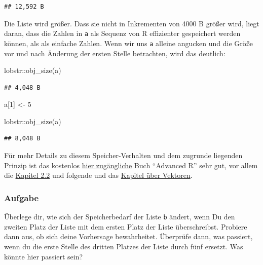 \documentclass[
]{book}
\newenvironment{Shaded}{\begin{snugshade}}{\end{snugshade}}
\newcommand{\DecValTok}[1]{\textcolor[rgb]{0.00,0.00,0.81}{#1}}
\newcommand{\FunctionTok}[1]{\textcolor[rgb]{0.00,0.00,0.00}{#1}}
\newcommand{\NormalTok}[1]{#1}
\newcommand{\OtherTok}[1]{\textcolor[rgb]{0.56,0.35,0.01}{#1}}
\newcommand{\SpecialCharTok}[1]{\textcolor[rgb]{0.00,0.00,0.00}{#1}}
\begin{document}
\begin{verbatim}
## 12,592 B
\end{verbatim}

Die Liste wird größer. Dass sie nicht in Inkrementen von 4000 B größer wird, liegt daran, dass die Zahlen in \texttt{a} als Sequenz von R effizienter gespeichert werden können, als als einfache Zahlen. Wenn wir uns \texttt{a} alleine angucken und die Größe vor und nach Änderung der ersten Stelle betrachten, wird das deutlich:

\begin{Shaded}
\begin{Highlighting}[]
\NormalTok{lobstr}\SpecialCharTok{::}\FunctionTok{obj\_size}\NormalTok{(a)}
\end{Highlighting}
\end{Shaded}

\begin{verbatim}
## 4,048 B
\end{verbatim}

\begin{Shaded}
\begin{Highlighting}[]
\NormalTok{a[}\DecValTok{1}\NormalTok{] }\OtherTok{\textless{}{-}} \DecValTok{5}

\NormalTok{lobstr}\SpecialCharTok{::}\FunctionTok{obj\_size}\NormalTok{(a)}
\end{Highlighting}
\end{Shaded}

\begin{verbatim}
## 8,048 B
\end{verbatim}

Für mehr Details zu diesem Speicher-Verhalten und dem zugrunde liegenden Prinzip ist das kostenlos \href{https://adv-r.hadley.nz/index.html}{hier zugängliche} Buch ``Advanced R'' \citet{wickhamAdvanced2019} sehr gut, vor allem die \href{https://adv-r.hadley.nz/names-values.html\#binding-basics}{Kapitel 2.2} und folgende und das \href{https://adv-r.hadley.nz/vectors-chap.html}{Kapitel über Vektoren}.

\hypertarget{aufgabe-5}{%
\subsubsection{Aufgabe}\label{aufgabe-5}}

Überlege dir, wie sich der Speicherbedarf der Liste \texttt{b} ändert, wenn Du den zweiten Platz der Liste mit dem ersten Platz der Liste überschreibst.
Probiere dann aus, ob sich deine Vorhersage bewahrheitet.
Überprüfe dann, was passiert, wenn du die erste Stelle des dritten Platzes der Liste durch fünf ersetzt.
Was könnte hier passiert sein?
\end{document}

